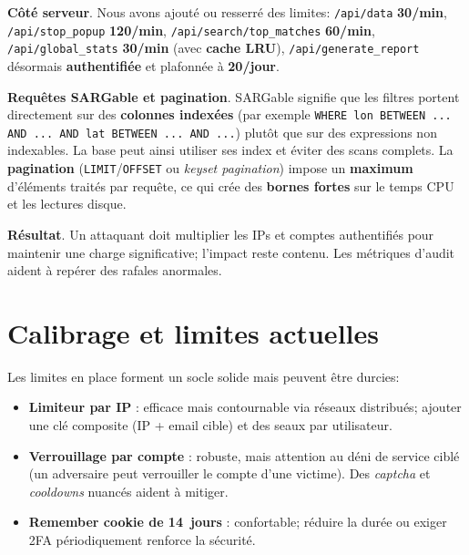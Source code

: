 \textbf{Côté serveur}. Nous avons ajouté ou resserré des limites: \texttt{/api/data} \textbf{30/min}, \texttt{/api/stop\_popup} \textbf{120/min}, \texttt{/api/search/top\_matches} \textbf{60/min}, \texttt{/api/global\_stats} \textbf{30/min} (avec \textbf{cache LRU}), \texttt{/api/generate\_report} désormais \textbf{authentifiée} et plafonnée à \textbf{20/jour}.

\noindent \textbf{Requêtes SARGable et pagination}. \og SARGable \fg{} signifie que les filtres portent directement sur des \textbf{colonnes indexées} (par exemple \texttt{WHERE lon BETWEEN ... AND ... AND lat BETWEEN ... AND ...}) plutôt que sur des expressions non indexables. La base peut ainsi utiliser ses index et éviter des scans complets. La \textbf{pagination} (\texttt{LIMIT}/\texttt{OFFSET} ou \emph{keyset pagination}) impose un \textbf{maximum} d'éléments traités par requête, ce qui crée des \textbf{bornes fortes} sur le temps CPU et les lectures disque.

\textbf{Résultat}. Un attaquant doit multiplier les IPs et comptes authentifiés pour maintenir une charge significative; l'impact reste contenu. Les métriques d'audit aident à repérer des rafales anormales.

\section{Calibrage et limites actuelles}
\noindent Les limites en place forment un socle solide mais peuvent être durcies:
\begin{itemize}
  \item \textbf{Limiteur par IP} : efficace mais contournable via réseaux distribués; ajouter une clé composite (IP + email cible) et des \og seaux \fg{} par utilisateur.
  \item \textbf{Verrouillage par compte} : robuste, mais attention au déni de service ciblé (un adversaire peut \og verrouiller \fg{} le compte d'une victime). Des \emph{captcha} et \emph{cooldowns} nuancés aident à mitiger.
  \item \textbf{Remember cookie de 14~jours} : confortable; réduire la durée ou exiger 2FA périodiquement renforce la sécurité.
\end{itemize}

